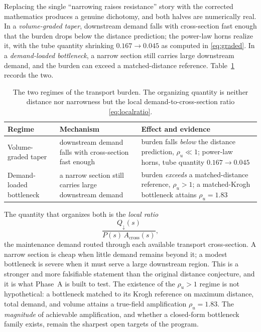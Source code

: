 \documentclass[11pt]{article}
\theoremstyle{remark}
\newcommand{\Acr}{A_{\mathrm{cross}}}
\newcommand{\Qdn}{Q_{\downarrow}}
\newcommand{\rhou}{\rho_u}
\begin{document}
Replacing the single ``narrowing raises resistance'' story with the corrected
mathematics produces a genuine dichotomy, and both halves are numerically real.
In a \emph{volume-graded taper}, downstream demand falls with cross-section fast
enough that the burden drops below the distance prediction; the power-law horns
realize it, with the tube quantity shrinking $0.167\to0.045$ as computed in
\eqref{eq:graded}. In a \emph{demand-loaded bottleneck}, a narrow section still
carries large downstream demand, and the burden can exceed a matched-distance
reference. Table~\ref{tab:regimes} records the two.

\begin{table}[t]
\centering
\begin{tabular}{@{}p{}p{}p{}@{}}
\toprule
\textbf{Regime} & \textbf{Mechanism} & \textbf{Effect and evidence}\\
\midrule
Volume-graded taper &
downstream demand falls with cross-section fast enough &
burden falls \emph{below} the distance prediction, $\rhou\ll1$; power-law horns,
tube quantity $0.167\to0.045$\\[4pt]
Demand-loaded bottleneck &
a narrow section still carries large downstream demand &
burden \emph{exceeds} a matched-distance reference, $\rhou>1$; a matched-Krogh
bottleneck attains $\rhou=1.83$\\
\bottomrule
\end{tabular}
\caption{The two regimes of the transport burden. The organizing quantity is
neither distance nor narrowness but the local demand-to-cross-section ratio
\eqref{eq:localratio}.}
\label{tab:regimes}
\end{table}

The quantity that organizes both is the \emph{local ratio}
\begin{equation}\label{eq:localratio}
\frac{\Qdn(s)}{P(s)\,\Acr(s)},
\end{equation}
the maintenance demand routed through each available transport cross-section. A
narrow section is cheap when little demand remains beyond it; a modest bottleneck
is severe when it must serve a large downstream region. This is a stronger and
more falsifiable statement than the original distance conjecture, and it is what
Phase~A is built to test. The existence of the $\rhou>1$ regime is not
hypothetical: a bottleneck matched to its Krogh reference on maximum distance,
total demand, and volume attains a true-field amplification $\rhou=1.83$. The
\emph{magnitude} of achievable amplification, and whether a closed-form
bottleneck family exists, remain the sharpest open targets of the program.
\end{document}
